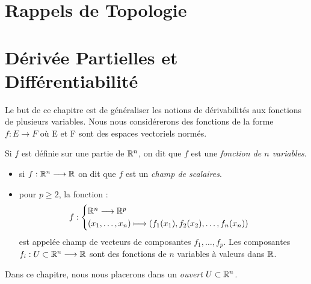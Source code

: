 
\minitoc  %


\section{Rappels de Topologie}




\section{Dérivée Partielles et Différentiabilité}

Le but de ce chapitre est de généraliser les notions de dérivabilités aux fonctions de plusieurs variables. 
Nous nous considérerons des fonctions de la forme $ f : E \longrightarrow F$ où E et F sont des espaces vectoriels normés. 

\begin{remark}[Notations]
    Si $f$ est définie sur une partie de $\mathbb{R}^n$, on dit que $f$ est une \emph{fonction de $n$ variables}.
    \begin{itemize}
        \item si $f : \mathbb{R}^n \longrightarrow \mathbb{R}$ on dit que $f$ est un \emph{champ de scalaires}. 
        \item pour $p \geqslant 2$, la fonction : 
            \[ f : 
                \begin{cases}
                    \mathbb{R}^n \longrightarrow \mathbb{R}^p \\ 
                    (x_1, \dots, x_n) \longmapsto (f_1(x_1), f_2(x_2), \dots, f_n(x_n))
                \end{cases} \] 
            est appelée champ de vecteurs de composantes $f_1, \dots, f_p$. 
            Les composantes $f_i : U \subset \mathbb{R}^n \longrightarrow \mathbb{R}$ sont des fonctions de $n$ variables à valeurs dans $\mathbb{R}$. 
    \end{itemize} 
    Dans ce chapitre, nous nous placerons dans un \emph{ouvert} $U \subset \mathbb{R}^n$. 
\end{remark}

